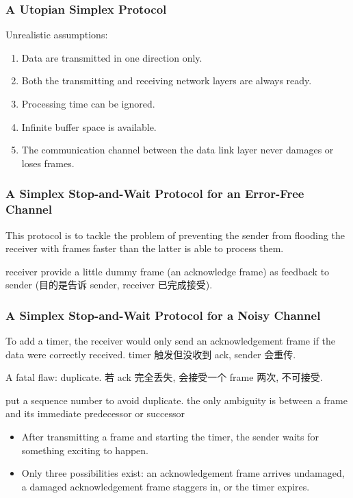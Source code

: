 \subsubsection{A Utopian Simplex Protocol}
Unrealistic assumptions:
\begin{enumerate}
    \item Data are transmitted in one direction only.
    \item Both the transmitting and receiving network layers are always ready.
    \item Processing time can be ignored.
    \item Infinite buffer space is available.
    \item The communication channel between the data link layer never damages or loses frames.
\end{enumerate}

\subsubsection{A Simplex Stop-and-Wait Protocol for an Error-Free Channel}
This protocol is to tackle the problem of preventing the sender from flooding the receiver with frames faster than the latter is able to process them.

receiver provide a little dummy frame (an acknowledge frame) as feedback to sender (目的是告诉 sender, receiver 已完成接受).

\subsubsection{A Simplex Stop-and-Wait Protocol for a Noisy Channel}
To add a timer, the receiver would only send an acknowledgement frame if the data were correctly received. timer 触发但没收到 ack, sender 会重传. 

A fatal flaw: duplicate. 若 ack 完全丢失, 会接受一个 frame 两次, 不可接受. 

put a sequence number to avoid duplicate. the only ambiguity is between a frame and its immediate predecessor or successor

\begin{itemize}
    \item After transmitting a frame and starting the timer, the sender waits for something exciting to happen.
    \item Only three possibilities exist: an acknowledgement frame arrives undamaged, a damaged acknowledgement frame staggers in, or the timer expires.
\end{itemize}

